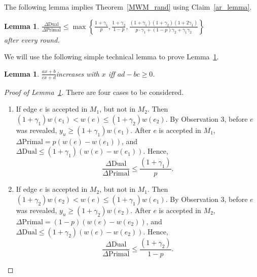 \documentclass[11pt]{article}
\newtheorem{lemma}[theorem]{Lemma}
\begin{document}
The following lemma implies Theorem~\ref{MWM_rand} using Claim~\ref{ar_lemma}.
\begin{lemma}\label{lemma_MWM}
 $\frac{\Delta \text{Dual}}{\Delta\text{Primal}} \leq \max\left\{\frac{1+\gamma_1}{p},\frac{1+\gamma_2}{1-p},\frac{(1+\gamma_1)(1+\gamma_2)(1+2\gamma_1)}{p\cdot \gamma_1 + (1-p)\gamma_2 + \gamma_1\gamma_2}\right\}$\\ after every round.
\end{lemma}
We will use the following simple technical lemma to prove Lemma~\ref{lemma_MWM}.
\begin{lemma}\label{key_lemma}
 $\frac{ax+b}{cx+d}$increases with $x$ iff $ad-bc\geq 0$.
\end{lemma}
\begin{proof}[Proof of Lemma~\ref{lemma_MWM}]
There are four cases to be considered.
\begin{enumerate}
 \item If edge $e$ is accepted in $M_1$, but not in $M_2$. Then $(1+\gamma_1)w(e_1)< w(e) \leq (1+\gamma_2)w(e_2)$. By Observation $3$, before $e$ was revealed, $y_u\geq(1+\gamma_1)w(e_1)$. After $e$ is accepted in $M_1$, $\Delta\text{Primal} =p(w(e)-w(e_1))$, and $\Delta\text{Dual} \leq (1+\gamma_1)(w(e)-w(e_1))$. Hence,
 \[
  \frac{\Delta\text{Dual}}{\Delta\text{Primal} }\leq \frac{(1+\gamma_1)}{p}.
 \]
\item If edge $e$ is accepted in $M_2$, but not in $M_1$. Then $(1+\gamma_2)w(e_2)< w(e) \leq (1+\gamma_1)w(e_1)$. By Observation $3$, before $e$ was revealed, $y_u\geq(1+\gamma_2)w(e_2)$. After $e$ is accepted in $M_2$, $\Delta\text{Primal} =(1-p)(w(e)-w(e_2))$, and $\Delta\text{Dual} \leq (1+\gamma_2)(w(e)-w(e_2))$. Hence,
 \[
  \frac{\Delta\text{Dual}}{\Delta\text{Primal} }\leq \frac{(1+\gamma_2)}{1-p}.
 \]


\end{enumerate}
\end{proof}
\end{document}
